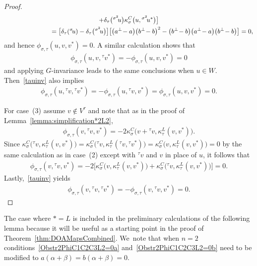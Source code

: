\documentclass[10pt,a4paper]{amsart}
\numberwithin{equation}{section}
\newcommand{\actby}[1]{{}^{#1}}
\newcommand{\actbylessspace}[1]{{}^{#1}\!}
\begin{document}
\begin{proof}
\begin{gather*}
+\delta_{\tau}\big(\actbylessspace{\sigma^2}u\big)\kappa^C_{\sigma}\big(u,\actbylessspace{\sigma^2}u^*\big)\big]
\\ \hphantom{\kappa^C_{\sigma}\big(u,\kappa^L_{\tau}(v,v^*)\big)}
=\big[\delta_{\tau}(\actbylessspace{\sigma}u)-\delta_{\tau}\big(\actbylessspace{\sigma^2}u\big)\big]
\big[\big(a^\perp\!-a\big)\big(b^\perp\!-b\big)^2-\big(b^\perp\!-b\big)\big(a^\perp\!-a\big)\big(b^\perp\!-b\big) \big] =0,
\end{gather*}
and hence $\phi_{\sigma,\tau}(u,v,v^*)=0$.
A similar calculation shows that
	\begin{gather*}
\phi_{\sigma,\tau}(u,v,\actbylessspace{\tau}v^*)=-\phi_{\sigma,\tau}(u,v,v^*)=0
\end{gather*}
and applying $G$-invariance
leads to the same conclusions when $u \in W$.
Then~\eqref{tauinv} also implies
\begin{gather*}
\phi_{\sigma,\tau}(u,\actby{\tau}v,\actby{\tau}v^*)=-\phi_{\sigma,\tau}(u,\actby{\tau}v,v^*) =\phi_{\sigma,\tau}(u,v,v^*)=0.
\end{gather*}
	
For case~(3) assume $v \notin V^{\tau}$ and note
that as in the proof of Lemma~\ref{lemma:simplification*2L2},
\begin{gather*}
\phi_{\sigma,\tau}(v,\actbylessspace{\tau}v,v^*)
=-2\kappa^C_{\sigma}\big(v+\actbylessspace{\tau}v,\kappa^L_{\tau}(v,v^*)\big).
\end{gather*}
Since $\kappa^C_{\sigma}\big(\actbylessspace{\tau}v,\kappa^L_{\tau}(v,v^*)\big)
=\kappa^C_{\sigma}\big(\actbylessspace{\tau}v,\kappa^L_{\tau}(\actbylessspace{\tau}v, \actbylessspace{\tau}v^*)\big)
=\kappa^C_{\sigma}\big(v,\kappa^L_{\tau}(v,v^*)\big)
=0$ by the same calculation as in
case~(2) except with $\actbylessspace{\tau}v$ and $v$ in place of $u$, it follows that
\begin{gather*}
\phi_{\sigma,\tau}(v,\actbylessspace{\tau}v,v^*)=
-2\big[\kappa^C_{\sigma}\big(v,\kappa^L_{\tau}(v,v^*)\big)+
\kappa^C_{\sigma}\big(\actbylessspace{\tau}v,\kappa^L_{\tau}(v,v^*)\big)\big]=0.
\end{gather*}
Lastly,~\eqref{tauinv} yields
\begin{gather*}
\phi_{\sigma,\tau}(v,\actby{\tau}v,\actby{\tau}v^*)=-\phi_{\sigma,\tau}(v,\actby{\tau}v,v^*)=0.\tag*{\qed}
\end{gather*}
\renewcommand{\qed}{}
\end{proof}

The case where $*=L$ is included in the preliminary calculations of the following
lemma because it will be useful as a starting point in the proof of
Theorem~\ref{thm:DOAMapsCombined}. We~note that when $n=2$ conditions~\eqref{Obstr2PhiC1C2C3L2=0a} and~\eqref{Obstr2PhiC1C2C3L2=0b} need to be modified to $a(\alpha+\beta)=b(\alpha+\beta)=0$.
\end{document}
